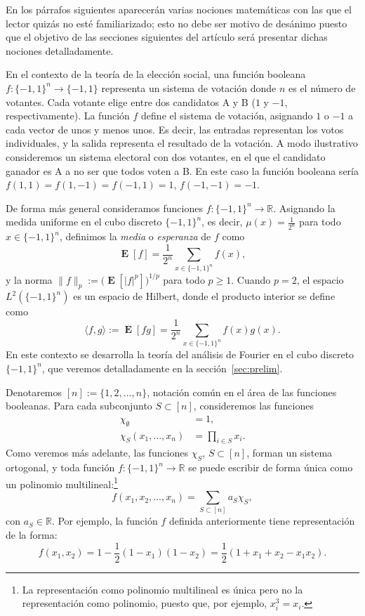 \documentclass[autocontact]{gaceta}
\newcommand{\R}{\mathbb{R}}
\DeclareMathOperator{\EE}{\mathbf{E}}
\begin{document}
En los párrafos siguientes aparecerán varias nociones matemáticas con las que el lector quizás no esté familiarizado; esto no debe ser motivo de desánimo puesto que el objetivo de las secciones siguientes del artículo será presentar dichas nociones detalladamente.

En el contexto de la teoría de la elección social, una función booleana $f:\{-1,1\}^n\to\{-1,1\}$ representa un sistema de votación donde $n$ es el número de votantes. Cada votante elige entre dos candidatos A y B ($1$ y $-1$, respectivamente). La función $f$ define el sistema de votación, asignando $1$ o $-1$ a cada vector de unos y menos unos. Es decir, las entradas representan los votos individuales, y la salida representa el resultado de la votación. A modo ilustrativo consideremos un sistema electoral con dos votantes, en el que el candidato ganador es A a no ser que todos voten a B. En este caso la función booleana sería $f(1,1)=f(1,-1)=f(-1,1)=1$, $f(-1,-1)=-1$.

De forma más general consideramos funciones $f:\{-1,1\}^n\to\R$.
Asignando la medida uniforme en el cubo discreto $\{-1,1\}^n$, es decir, $\mu(x)=\frac{1}{2^n}$ para todo $x\in\{-1,1\}^n$, definimos la \emph{media} o \emph{esperanza} de $f$ como
\[
   \EE[f] =\frac{1}{2^n}\sum_{x\in\{-1,1\}^n} f(x),
\]
y la norma $\|f\|_p:= \big(\EE[|f|^p]\big)^{1/p}$ para todo $p\geq 1$. Cuando $p=2$, el espacio $L^2(\{-1,1\}^n)$ es un espacio de Hilbert, donde el producto interior se define como
\[
 \langle f,g\rangle := \EE[fg]= \frac{1}{2^n} \sum_{x\in \{-1,1\}^n}f(x)g(x).
\]
En este contexto se desarrolla la teoría del análisis de Fourier en el cubo discreto $\{-1,1\}^n$, que veremos detalladamente en la sección~\ref{sec:prelim}.

Denotaremos $[n]:=\{1,2,\dots, n\}$, notación común en el área de las funciones booleanas. Para cada subconjunto $S\subset [n]$, consideremos las funciones
\begin{align*}
   \chi_{\emptyset} &= 1,
   \\
   \chi_S(x_1,\dots,x_n) &= \prod_{i\in S} x_i.
\end{align*}
Como veremos más adelante, las funciones $\chi_S$, $S\subset [n]$, forman un sistema ortogonal, y toda función $f:\{-1,1\}^n\to\R$ se puede escribir de forma única como un polinomio multilineal:\footnote{La representación como polinomio multilineal es única pero no la representación como polinomio, puesto que, por ejemplo, $x_i^3 = x_i$.}
\begin{equation}\label{ecn:desarrollo_fourier}
   f(x_1,x_2,\dots, x_n) = \sum_{S\subset [n]} a_S \chi_S,
\end{equation}
con $a_S\in \R$.
Por ejemplo, la función $f$ definida anteriormente tiene representación de la forma:
\[
f(x_1,x_2)=1-\frac{1}{2}(1-x_1)(1-x_2)=\frac{1}{2}(1+x_1+x_2-x_1x_2).
\]
\end{document}
